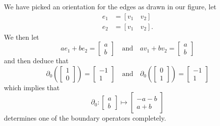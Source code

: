 We have picked an orientation for the edges as drawn in our
figure, let 
\begin{subequations}
\begin{align}
e_{1} &= [v_{1} \quad v_{2}]\\
e_{2} &= [v_{1} \quad v_{2}].
\end{align}
\end{subequations}
We then let
\begin{equation}%
ae_{1}+be_{2}=\begin{bmatrix}a\\b\end{bmatrix}\quad\text{and}\quad 
av_{1}+bv_{2}=\begin{bmatrix}a\\b\end{bmatrix}
\end{equation}
and then deduce that
\begin{equation}%
\partial_{0}\left(\begin{bmatrix}1\\0\end{bmatrix}\right)=\begin{bmatrix}-1\\1\end{bmatrix}\quad\text{and}\quad
\partial_{0}\left(\begin{bmatrix}0\\1\end{bmatrix}\right)=\begin{bmatrix}-1\\1\end{bmatrix}
\end{equation}
which implies that
\begin{equation}%
\partial_{0}:\begin{bmatrix}a\\b\end{bmatrix}\mapsto\begin{bmatrix}-a-b\\a+b\end{bmatrix}
\end{equation}
determines one of the boundary operators completely. 

